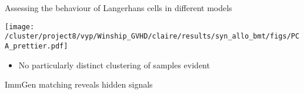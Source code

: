 \documentclass[final,hyperref={pdfpagelabels=false}]{beamer}
\begin{document}
\begin{frame}{}
\begin{columns}[t]
\begin{column}{.36\linewidth}
\begin{block}{Assessing the behaviour of Langerhans cells in different models}

%



	  \begin{minipage}{0.4\textwidth}
	   \texttt{[image: /cluster/project8/vyp/Winship\_GVHD/claire/results/syn\_allo\_bmt/figs/PCA\_prettier.pdf]}
          \end{minipage}
	  \begin{minipage}{0.4\textwidth}
	      {\small          \begin{itemize}
		\item No particularly distinct clustering of samples evident
              \end{itemize}}
	  \end{minipage}
   \end{block}

\begin{block}{ImmGen matching reveals hidden signals}


\end{block}
\end{column}
\end{columns}
\end{frame}
\end{document}
